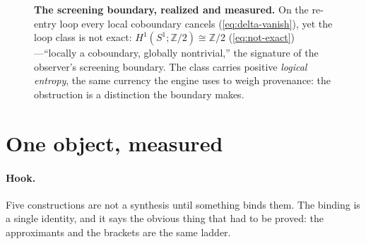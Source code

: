 \documentclass[11pt,letterpaper]{article}
\theoremstyle{plain}
\theoremstyle{definition}
\theoremstyle{remark}
\newcommand{\bbtwo}{\mathbb{Z}/2}
\newcommand{\Llog}{h}                                   %
\begin{document}
\begin{figure}[t]
\centering
{}
\caption{\textbf{The screening boundary, realized and measured.} On the
re-entry loop every local coboundary cancels (\cref{eq:delta-vanish}), yet the
loop class is not exact: $H^1(S^1;\bbtwo)\cong\bbtwo$
(\cref{eq:not-exact})---``locally a coboundary, globally nontrivial,'' the
signature of the observer's screening boundary. The class carries positive
\emph{logical entropy}, the same currency the engine uses to weigh provenance: the
obstruction is a distinction the boundary makes.}
\label{fig:screen}
\end{figure}

\section{One object, measured}\label{sec:synthesis}

\paragraph{Hook.}
Five constructions are not a synthesis until something binds them. The binding is
a single identity, and it says the obvious thing that had to be proved: the
approximants and the brackets are the same ladder.
\end{document}
